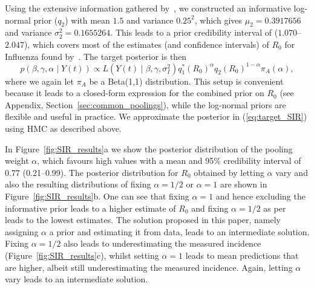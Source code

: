 \documentclass[a4paper, notitlepage, 10pt]{article}
\begin{document}
Using the extensive information gathered by~\cite{Biggerstaff2014}, we constructed an informative log-normal prior ($q_2$) with mean $1.5$ and variance $0.25^2$, which gives $\mu_2 = 0.3917656$ and variance $\sigma_2^2 =  0.1655264$.
This leads to a prior credibility interval of ($1.070$--$2.047$), which covers most of the estimates (and confidence intervals) of $R_0$ for Influenza found by~\cite{Biggerstaff2014}.
The target posterior is then
\begin{equation}
 \label{eq:target_SIR}
 p(\beta, \gamma, \alpha \mid Y(t)) \propto  L(Y(t)\mid \beta, \gamma, \sigma_I^2) q_1^\ast(R_0)^\alpha q_2(R_0)^{1-\alpha}\pi_A(\alpha),
\end{equation}
where we again let $\pi_A$ be a Beta(1,1) distribution.
This setup is convenient because it leads to a closed-form expression for the combined prior on $R_0$ (see Appendix, Section~\ref{sec:common_poolings}), while the log-normal priors are flexible and useful in practice.
We approximate the posterior in (\ref{eq:target_SIR}) using HMC as described above.

In Figure~\ref{fig:SIR_results}a we show the posterior distribution of the pooling weight $\alpha$, which favours high values with a mean and 95\% credibility interval of 0.77 (0.21--0.99).
The posterior distribution for $R_0$ obtained by letting $\alpha$ vary and also the resulting distributions of fixing $\alpha = 1/2$ or $\alpha = 1$ are shown in Figure~\ref{fig:SIR_results}b.
One can see that fixing $\alpha = 1$ and hence excluding the informative prior leads to a higher estimate of $R_0$ and fixing $\alpha = 1/2$ as per~\cite{Poole2000} leads to the lowest estimates.
The solution proposed in this paper, namely assigning $\alpha$ a prior and estimating it from data, leads to an intermediate solution.
Fixing $\alpha = 1/2$ also leads to underestimating the measured incidence (Figure~\ref{fig:SIR_results}c), whilst setting $\alpha = 1$ leads to mean predictions that are higher, albeit still underestimating the measured incidence.
Again, letting $\alpha$ vary leads to an intermediate solution.
\end{document}
